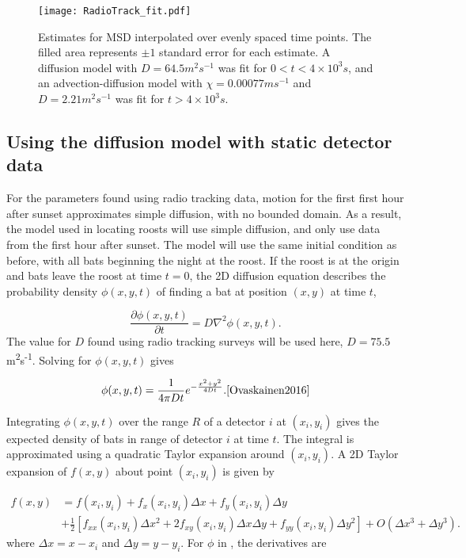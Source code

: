 \begin{figure} [h]
\centering
      \texttt{[image: RadioTrack\_fit.pdf]}
      \caption{Estimates for MSD interpolated over evenly spaced time points. The filled area represents $\pm 1$ standard error for each estimate.
      A diffusion model with $D = 64.5 m^2s^{-1}$ was fit for $0 < t < 4 \times 10^3 s$, and an advection-diffusion model with $\chi = 0.00077 ms^{-1}$ and $D = 2.21 m^2s^{-1}$ was fit for $t > 4 \times 10^3 s$.}
      \label{fig:RadioTrackFit}
\end{figure}


\subsection{Using the diffusion model with static detector data}

For the parameters found using radio tracking data, motion for the first first hour after sunset approximates simple diffusion, with no bounded domain. As a result, the model used in locating roosts will use simple diffusion, and only use data from the first hour after sunset. The model will use the same initial condition as before, with all bats beginning the night at the roost. If the roost is at the origin and bats leave the roost at time $t =0$, the 2D diffusion equation describes the probability density $\phi(x,y,t)$ of finding a bat at position $(x,y)$ at time $t$,

\begin{equation}
  \frac{\partial \phi(x,y,t)}{\partial t} = D \nabla^2 \phi(x,y,t) .
  \nonumber
\end{equation}
%
The value for $D$ found using radio tracking surveys will be used here, $D = 75.5$ m\textsuperscript{2}s\textsuperscript{-1}. Solving for $\phi(x,y,t)$ gives

\begin{equation}
  \phi(x,y,t) = \frac{1}{4 \pi D t} e^{-\frac{x^2 + y^2}{4Dt}}. \cite{Ovaskainen2016}
  \label{eqn:phi}
\end{equation}


Integrating $\phi(x,y,t)$ over the range $R$ of a detector $i$ at $(x_i, y_i)$ gives
the expected density of bats in range of detector $i$ at time $t$. The
integral is approximated using a quadratic Taylor expansion around $(x_i, y_i)$. A 2D Taylor expansion of $f(x,y)$ about point $(x_i, y_i)$ is given by

\begin{equation}
\begin{split}
f(x,y) &= f(x_i,y_i) + f_x(x_i,y_i)\Delta x + f_y(x_i,y_i)\Delta y \\
       &+ \frac{1}{2}\left[ f_{xx}(x_i,y_i) \Delta x^2 + 2 f_{xy}(x_i,y_i) \Delta x \Delta y + f_{yy}(x_i,y_i) \Delta y^2 \right] + O(\Delta x^3 + \Delta y^3) .
\end{split}
\label{eqn:taylor}
\end{equation}
%
where $\Delta x = x-x_i$ and $\Delta y = y - y_i$. For $\phi$ in , the derivatives are


